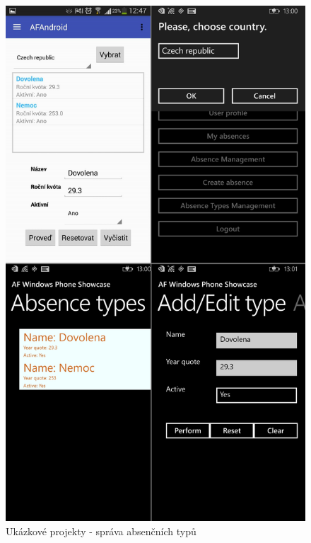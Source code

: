\begin{figure}
\includegraphics[width=\linewidth]{figures/screenshots/AbsenceType}
\caption{Ukázkové projekty - správa absenčních typů}
\label{img:AbsenceType}
\end{figure}	

